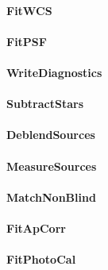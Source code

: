 \paragraph{FitWCS}
\label{sec:drpBootstrapImChar_FitWCS}

\paragraph{FitPSF}
\label{sec:drpBootstrapImChar_FitPSF}

\paragraph{WriteDiagnostics}
\label{sec:drpBootstrapImChar_WriteDiagnostics}

\paragraph{SubtractStars}
\label{sec:drpBootstrapImChar_SubtractStars}

\paragraph{DeblendSources}
\label{sec:drpBootstrapImChar_DeblendSources}

\paragraph{MeasureSources}
\label{sec:drpBootstrapImChar_MeasureSources}

\paragraph{MatchNonBlind}
\label{sec:drpBootstrapImChar_MatchNonBlind}

\paragraph{FitApCorr}
\label{sec:drpBootstrapImChar_FitApCorr}

\paragraph{FitPhotoCal}
\label{sec:drpBootstrapImChar_FitPhotoCal}

\let\hr\undefined

